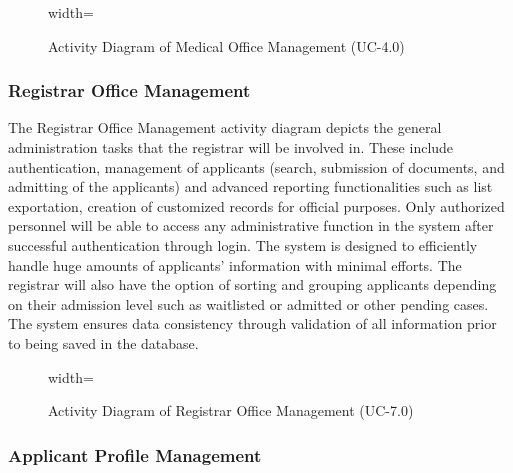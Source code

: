 \begin{figure}[H]
    \centering
    \begin{adjustbox}{width=\textwidth}
        
    \end{adjustbox}
    \caption{Activity Diagram of Medical Office Management (UC-4.0)}
    \label{fig:medical_office_activity}
\end{figure}
\FloatBarrier

\subsubsection{Registrar Office Management}

The Registrar Office Management activity diagram depicts the general administration tasks that the registrar will be involved in. These include authentication, management of applicants (search, submission of documents, and admitting of the applicants) and advanced reporting functionalities such as list exportation, creation of customized records for official purposes. Only authorized personnel will be able to access any administrative function in the system after successful authentication through login. The system is designed to efficiently handle huge amounts of applicants' information with minimal efforts. The registrar will also have the option of sorting and grouping applicants depending on their admission level such as waitlisted or admitted or other pending cases. The system ensures data consistency through validation of all information prior to being saved in the database.

\begin{figure}[H]
    \centering
    \begin{adjustbox}{width=\textwidth}
        
    \end{adjustbox}
    \caption{Activity Diagram of Registrar Office Management (UC-7.0)}
    \label{fig:registrar_office_activity}
\end{figure}
\FloatBarrier

\subsubsection{Applicant Profile Management}


